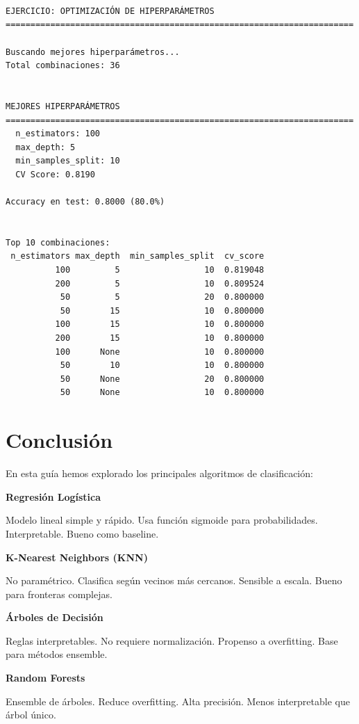 \documentclass[
  doc,
  floatsintext,
  longtable,
  a4paper,
  nolmodern,
  notxfonts,
  notimes,
  12pt,
  colorlinks=true,linkcolor=blue,citecolor=blue,urlcolor=blue]{apa7}
\begin{document}
\begin{verbatim}



EJERCICIO: OPTIMIZACIÓN DE HIPERPARÁMETROS
======================================================================

Buscando mejores hiperparámetros...
Total combinaciones: 36


MEJORES HIPERPARÁMETROS
======================================================================
  n_estimators: 100
  max_depth: 5
  min_samples_split: 10
  CV Score: 0.8190

Accuracy en test: 0.8000 (80.0%)


Top 10 combinaciones:
 n_estimators max_depth  min_samples_split  cv_score
          100         5                 10  0.819048
          200         5                 10  0.809524
           50         5                 20  0.800000
           50        15                 10  0.800000
          100        15                 10  0.800000
          200        15                 10  0.800000
          100      None                 10  0.800000
           50        10                 10  0.800000
           50      None                 20  0.800000
           50      None                 10  0.800000
\end{verbatim}

\section{Conclusión}\label{conclusiuxf3n}

En esta guía hemos explorado los principales algoritmos de
clasificación:

\textbf{Regresión Logística}

Modelo lineal simple y rápido. Usa función sigmoide para probabilidades.
Interpretable. Bueno como baseline.

\textbf{K-Nearest Neighbors (KNN)}

No paramétrico. Clasifica según vecinos más cercanos. Sensible a escala.
Bueno para fronteras complejas.

\textbf{Árboles de Decisión}

Reglas interpretables. No requiere normalización. Propenso a
overfitting. Base para métodos ensemble.

\textbf{Random Forests}

Ensemble de árboles. Reduce overfitting. Alta precisión. Menos
interpretable que árbol único.
\end{document}
